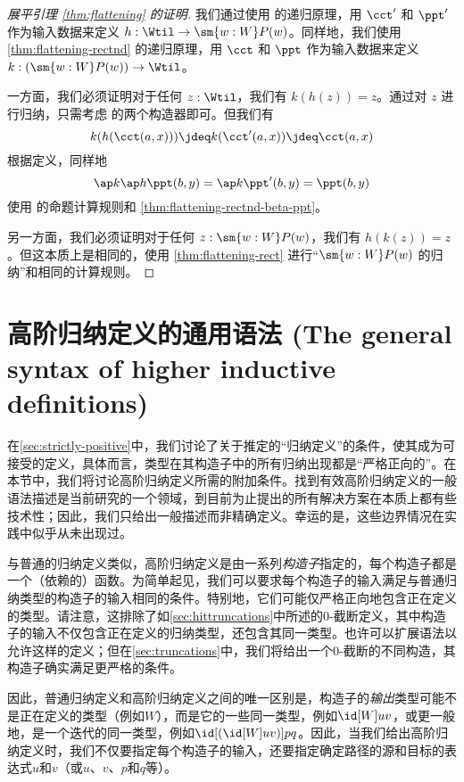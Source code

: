 \begin{proof}[展平引理 \cref{thm:flattening} 的证明]
  我们通过使用 \Wtil 的递归原理，用 $\cct'$ 和 $\ppt'$ 作为输入数据来定义 $h:\Wtil \to \sm{w:W}P(w)$。同样地，我们使用 \cref{thm:flattening-rectnd} 的递归原理，用 $\cct$ 和 $\ppt$ 作为输入数据来定义 $k:(\sm{w:W}P(w)) \to \Wtil$。

  一方面，我们必须证明对于任何 $z:\Wtil$，我们有 $k(h(z))=z$。通过对 $z$ 进行归纳，只需考虑 \Wtil 的两个构造器即可。但我们有
  \[k(h(\cct(a,x))) \jdeq k(\cct'(a,x)) \jdeq \cct(a,x)\]
  根据定义，同样地
  \[\ap k{\ap h{\ppt(b,y)}} = \ap k{\ppt'(b,y)} = \ppt(b,y) \]
  使用 \Wtil 的命题计算规则和 \cref{thm:flattening-rectnd-beta-ppt}。

  另一方面，我们必须证明对于任何 $z:\sm{w:W}P(w)$，我们有 $h(k(z))=z$。但这本质上是相同的，使用 \cref{thm:flattening-rect} 进行“$\sm{w:W}P(w)$ 的归纳”和相同的计算规则。
\end{proof}

\section{高阶归纳定义的通用语法 (The general syntax of higher inductive definitions)}
\label{sec:naturality}

在\cref{sec:strictly-positive}中，我们讨论了关于推定的“归纳定义”的条件，使其成为可接受的定义，具体而言，类型在其构造子中的所有归纳出现都是“严格正向的”。在本节中，我们将讨论高阶归纳定义所需的附加条件。找到有效高阶归纳定义的一般语法描述是当前研究的一个领域，到目前为止提出的所有解决方案在本质上都有些技术性；因此，我们只给出一般描述而非精确定义。幸运的是，这些边界情况在实践中似乎从未出现过。

与普通的归纳定义类似，高阶归纳定义是由一系列\emph{构造子}指定的，每个构造子都是一个（依赖的）函数。为简单起见，我们可以要求每个构造子的输入满足与普通归纳类型的构造子的输入相同的条件。特别地，它们可能仅严格正向地包含正在定义的类型。请注意，这排除了如\cref{sec:hittruncations}中所述的$0$-截断定义，其中构造子的输入不仅包含正在定义的归纳类型，还包含其同一类型。也许可以扩展语法以允许这样的定义；但在\cref{sec:truncations}中，我们将给出一个$0$-截断的不同构造，其构造子确实满足更严格的条件。

因此，普通归纳定义和高阶归纳定义之间的唯一区别是，构造子的\emph{输出}类型可能不是正在定义的类型（例如$W$），而是它的一些同一类型，例如$\id[W]uv$，或更一般地，是一个迭代的同一类型，例如$\id[({\id[W]uv})]pq$。因此，当我们给出高阶归纳定义时，我们不仅要指定每个构造子的输入，还要指定确定路径的源和目标的表达式$u$和$v$（或$u$、$v$、$p$和$q$等）。

